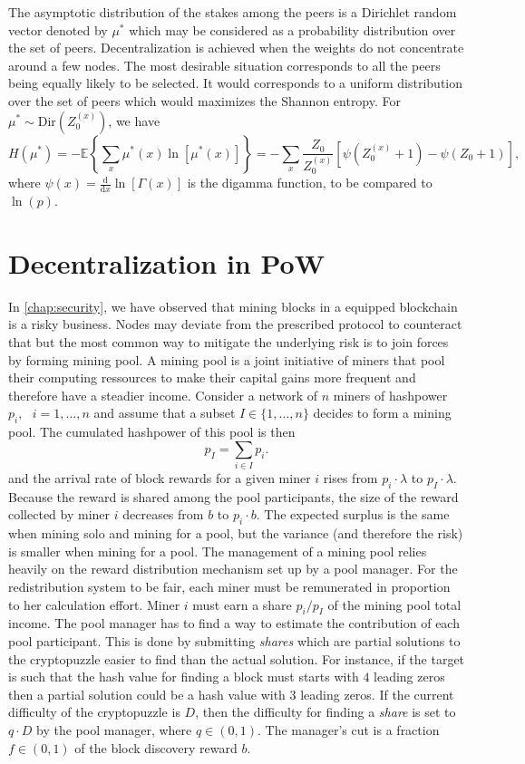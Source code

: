 The asymptotic distribution of the stakes among the peers is a Dirichlet random vector denoted by $\mu^{\ast}$ which may be considered as a probability distribution over the set of peers. Decentralization is achieved when the weights do not concentrate around a few nodes. The most desirable situation corresponds to all the peers being equally likely to be selected. It would corresponds to a uniform distribution over the set of peers which would maximizes the Shannon entropy. For $\mu^{\ast}\sim \text{Dir}(Z^{(x)}_0)$, we have 
$$
H(\mu^\ast) = -\mathbb{E}\left\{\sum_x \mu^\ast(x)\ln[\mu^\ast(x)]\right\} = -\sum_x\frac{Z_0}{Z_0^{(x)}}\left[\psi(Z_0^{(x)}+1)-\psi(Z_0+1)\right],
$$
where $\psi(x) = \frac{\text{d}}{\text{d}x}\ln[\Gamma(x)]$ is the digamma function, to be compared to $\ln(p)$.

\section{Decentralization in PoW}\label{sec:decentralization_pow}
In \cref{chap:security}, we have observed that mining blocks in a \PoW equipped blockchain is a risky business. Nodes may deviate from the prescribed protocol to counteract that but the most common way to mitigate the underlying risk is to join forces by forming mining pool. A mining pool is a joint initiative of miners that pool their computing ressources to make their capital gains more frequent and therefore have a steadier income. Consider a network of $n$ miners of hashpower $p_i, \text{ }i = 1,\ldots, n$ and assume that a subset $I\in \{1,\ldots, n\}$ decides to form a mining pool. The cumulated hashpower of this pool is then
\[
p_I = \sum_{i\in I}p_i.
\]
and the arrival rate of block rewards for a given miner $i$ rises from $p_i\cdot\lambda$ to $p_I\cdot\lambda$. Because the reward is shared among the pool participants, the size of the reward collected by miner $i$ decreases from $b$ to $p_i\cdot b$. The expected surplus is the same when mining solo and mining for a pool, but the variance (and therefore the risk) is smaller when mining for a pool. The management of a mining pool relies heavily on the reward distribution mechanism set up by a pool manager. For the redistribution system to be fair, each miner must be remunerated in proportion to her calculation effort. Miner $i$ must earn a share $p_i/p_I$
of the mining pool total income. The pool manager has to find a way to estimate the contribution of each pool participant. This is done by submitting \textit{shares} which are partial solutions to the cryptopuzzle easier to find than the actual solution. For instance, if the target is such that the hash value for finding a block must starts with $4$ leading zeros then a partial solution could be a hash value with $3$ leading zeros.  If the current difficulty of the cryptopuzzle is $D$, then the difficulty for finding a \textit{share} is set to $q\cdot D$ by the pool manager, where $q\in(0,1)$. The manager's cut is a fraction $f\in(0,1)$ of the block discovery reward $b$.\\

